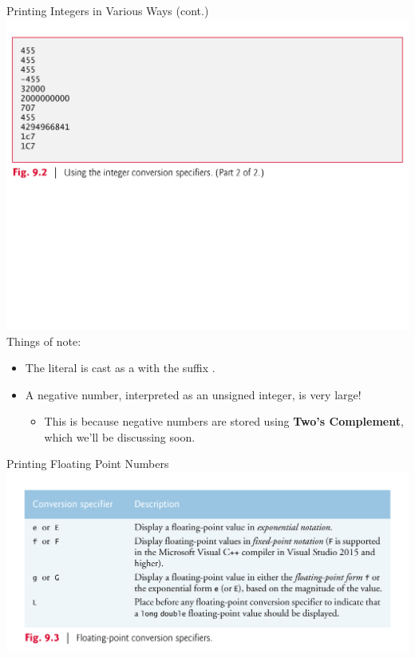 \documentclass[11pt]{beamer}
\let\OldTexttt\texttt
\renewcommand{\texttt}[1]{\OldTexttt{\color{teal}{#1}}}
\begin{document}
\begin{frame}{Printing Integers in Various Ways (cont.)}
\center
\includegraphics[scale=0.35]{intExample2.png}
\flushleft
Things of note:
\begin{itemize}
\item The literal \texttt{2000000000L} is cast as a \texttt{long int} with the suffix \texttt{L}.
\item A negative number, interpreted as an unsigned integer, is very large! 
\begin{itemize}
\item This is because negative numbers are stored using \textbf{Two's Complement}, which we'll be discussing soon.
\end{itemize}
\end{itemize}
\end{frame}

\begin{frame}{Printing Floating Point Numbers}
\center
\includegraphics[scale=0.12]{floats.png}
\end{frame}
\end{document}
